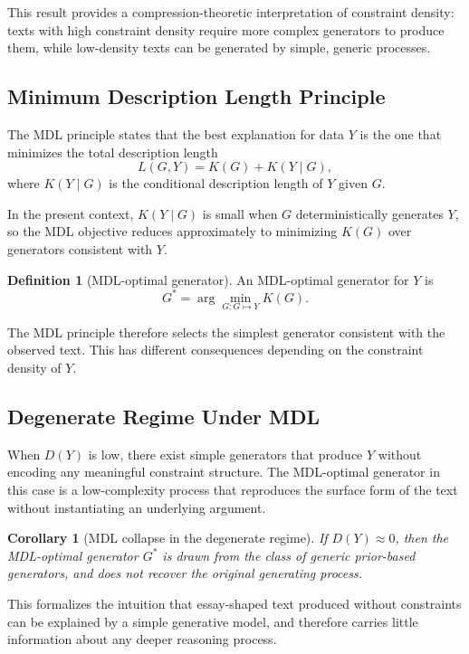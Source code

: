 \documentclass[12pt, oneside]{article}
\theoremstyle{plain}
\newtheorem{corollary}[theorem]{Corollary}
\theoremstyle{definition}
\newtheorem{definition}[theorem]{Definition}
\theoremstyle{remark}
\begin{document}
This result provides a compression-theoretic interpretation of constraint density:
texts with high constraint density require more complex generators to produce them,
while low-density texts can be generated by simple, generic processes.

\subsection{Minimum Description Length Principle}

The MDL principle states that the best explanation for data $Y$ is the one that
minimizes the total description length
\[
  L(G, Y) = K(G) + K(Y \mid G),
\]
where $K(Y \mid G)$ is the conditional description length of $Y$ given $G$.

In the present context, $K(Y \mid G)$ is small when $G$ deterministically generates $Y$,
so the MDL objective reduces approximately to minimizing $K(G)$ over generators
consistent with $Y$.

\begin{definition}[MDL-optimal generator]
An MDL-optimal generator for $Y$ is
\[
  G^* = \arg\min_{G : G \mapsto Y} K(G).
\]
\end{definition}

The MDL principle therefore selects the simplest generator consistent with the
observed text. This has different consequences depending on the constraint density
of $Y$.

\subsection{Degenerate Regime Under MDL}

When $D(Y)$ is low, there exist simple generators that produce $Y$ without encoding
any meaningful constraint structure. The MDL-optimal generator in this case is a
low-complexity process that reproduces the surface form of the text without
instantiating an underlying argument.

\begin{corollary}[MDL collapse in the degenerate regime]
If $D(Y) \approx 0$, then the MDL-optimal generator $G^*$ is drawn from the class
of generic prior-based generators, and does not recover the original generating
process.
\end{corollary}

This formalizes the intuition that essay-shaped text produced without constraints
can be explained by a simple generative model, and therefore carries little
information about any deeper reasoning process.
\end{document}
